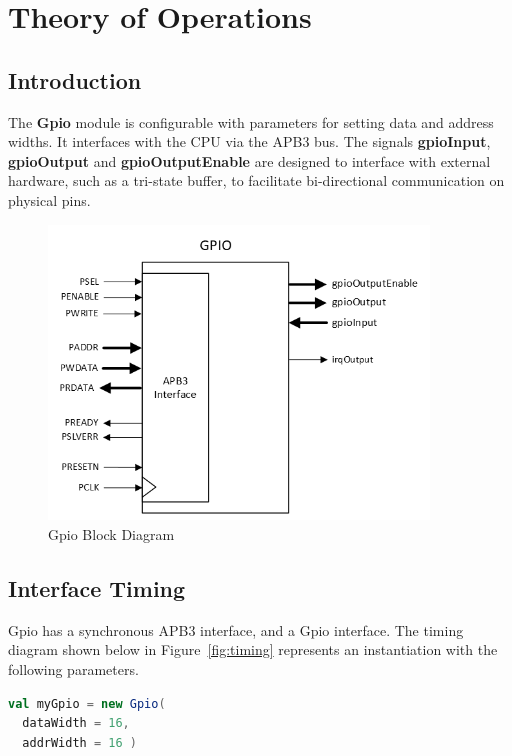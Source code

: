 \section{Theory of Operations}

\subsection{Introduction}
The \textbf{Gpio} module is configurable with parameters for setting data and address widths. It interfaces with the CPU via the APB3 bus. The signals \textbf{gpioInput}, \textbf{gpioOutput} and \textbf{gpioOutputEnable} are designed to interface with external hardware, such as a tri-state buffer, to facilitate bi-directional communication on physical pins.

\begin{figure}[h]
  \includegraphics[width=0.90\textwidth]{images/block-diagram-gpio.png}
  \caption{Gpio Block Diagram}\label{fig:block-diagram}
\end{figure}

\newpage
\subsection{Interface Timing}

Gpio has a synchronous APB3 interface, and a Gpio interface. The timing diagram shown below
in Figure~\ref{fig:timing} represents an instantiation with the following
parameters.

\begin{lstlisting}[language=Scala]
val myGpio = new Gpio(
  dataWidth = 16, 
  addrWidth = 16 ) 
\end{lstlisting}

